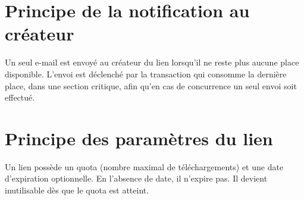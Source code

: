 \section{Principe de la notification au créateur}

\begin{hypothesisbox}
Un seul e-mail est envoyé au créateur du lien lorsqu'il ne reste plus aucune place disponible. L'envoi est déclenché par la transaction qui consomme la dernière place, dans une section critique, afin qu'en cas de concurrence un seul envoi soit effectué.
\end{hypothesisbox}

\section{Principe des paramètres du lien}

\begin{hypothesisbox}
Un lien possède un quota (nombre maximal de téléchargements) et une date d'expiration optionnelle. En l'absence de date, il n'expire pas. Il devient inutilisable dès que le quota est atteint.
\end{hypothesisbox}

